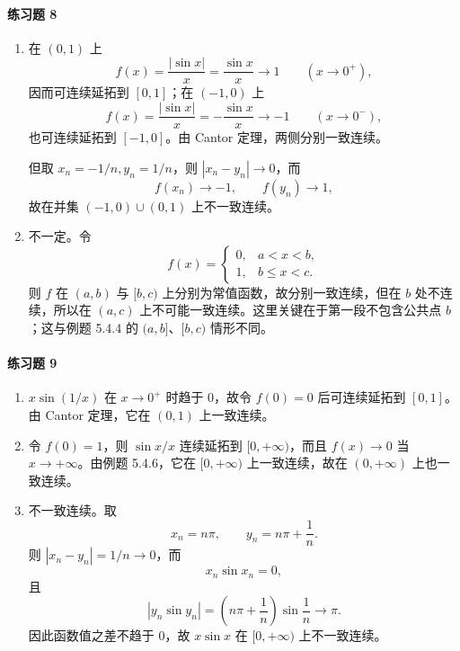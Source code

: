 \paragraph{练习题 8}
\begin{xsolution}
\begin{enumerate}[label=(\arabic*)]
 \item 在 $(0,1)$ 上
 \[
  f(x)=\frac{|\sin x|}{x}=\frac{\sin x}{x}\longrightarrow1
  \qquad(x\to0^+),
 \]
 因而可连续延拓到 $[0,1]$；在 $(-1,0)$ 上
 \[
  f(x)=\frac{|\sin x|}{x}=-\frac{\sin x}{x}\longrightarrow-1
  \qquad(x\to0^-),
 \]
 也可连续延拓到 $[-1,0]$。由 Cantor 定理，两侧分别一致连续。

 但取 $x_n=-1/n,y_n=1/n$，则 $|x_n-y_n|\to0$，而
 \[
  f(x_n)\to-1,
  \qquad f(y_n)\to1,
 \]
 故在并集 $(-1,0)\cup(0,1)$ 上不一致连续。

 \item 不一定。令
 \[
  f(x)=\begin{cases}0,&a<x<b,\\1,&b\le x<c.
  \end{cases}
 \]
 则 $f$ 在 $(a,b)$ 与 $[b,c)$ 上分别为常值函数，故分别一致连续，但在 $b$ 处不连续，所以在 $(a,c)$ 上不可能一致连续。这里关键在于第一段不包含公共点 $b$；这与例题 5.4.4 的 $(a,b]$、$[b,c)$ 情形不同。
\end{enumerate}
\end{xsolution}

\paragraph{练习题 9}
\begin{xsolution}
\begin{enumerate}[label=(\arabic*)]
 \item $x\sin(1/x)$ 在 $x\to0^+$ 时趋于 $0$，故令 $f(0)=0$ 后可连续延拓到 $[0,1]$。由 Cantor 定理，它在 $(0,1)$ 上一致连续。

 \item 令 $f(0)=1$，则 $\sin x/x$ 连续延拓到 $[0,+\infty)$，而且 $f(x)\to0$ 当 $x\to+\infty$。由例题 5.4.6，它在 $[0,+\infty)$ 上一致连续，故在 $(0,+\infty)$ 上也一致连续。

 \item 不一致连续。取
 \[
  x_n=n\pi,
  \qquad y_n=n\pi+\frac1n.
 \]
 则 $|x_n-y_n|=1/n\to0$，而
 \[
  x_n\sin x_n=0,
 \]
 且
 \[
  |y_n\sin y_n|
  =\left(n\pi+\frac1n\right)\sin\frac1n
  \longrightarrow\pi.
 \]
 因此函数值之差不趋于 $0$，故 $x\sin x$ 在 $[0,+\infty)$ 上不一致连续。
\end{enumerate}
\end{xsolution}

